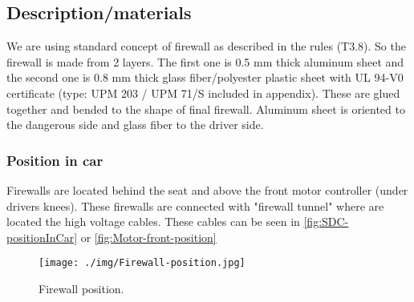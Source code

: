 \subsection{Description/materials}

We are using standard concept of firewall as described in the rules (T3.8). So the firewall is made from 2 layers. The first one is 0.5 mm thick aluminum sheet and the second one is 0.8 mm thick glass fiber/polyester plastic sheet with UL 94-V0 certificate (type: UPM 203 / UPM 71/S included in appendix). These are glued together and bended to the shape of final firewall. Aluminum sheet is oriented to the dangerous side and glass fiber to the driver side.

\subsubsection{Position in car}

Firewalls are located behind the seat and above the front motor controller (under drivers knees). These firewalls are connected with "firewall tunnel" where are located the high voltage cables. These cables can be seen in \ref{fig:SDC-positionInCar} or \ref{fig:Motor-front-position} 

\begin{figure}[H]
	\centering
	\texttt{[image: ./img/Firewall-position.jpg]}
	\caption{Firewall position.}
	\label{fig:Firewall-position}
\end{figure}
